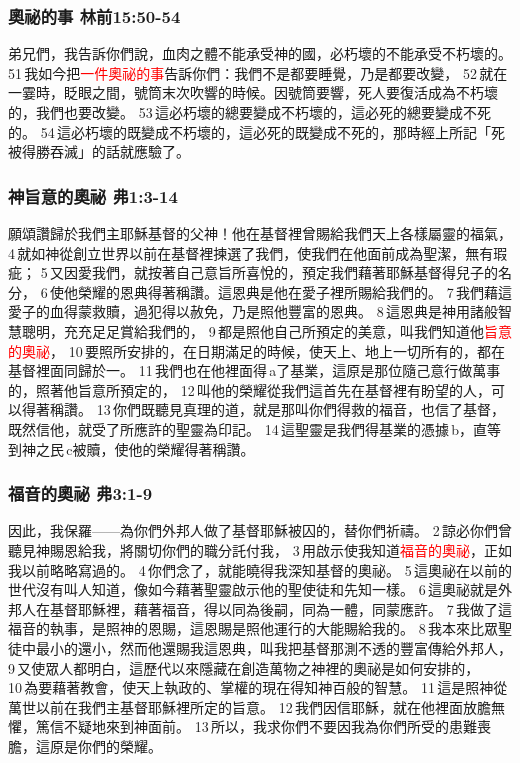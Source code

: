 \subsubsection{奧祕的事 林前15:50-54}
弟兄們，我告訴你們說，血肉之體不能承受神的國，必朽壞的不能承受不朽壞的。 51 我如今把\textcolor{red}{一件奧祕的事}告訴你們：我們不是都要睡覺，乃是都要改變， 52 就在一霎時，眨眼之間，號筒末次吹響的時候。因號筒要響，死人要復活成為不朽壞的，我們也要改變。 53 這必朽壞的總要變成不朽壞的，這必死的總要變成不死的。 54 這必朽壞的既變成不朽壞的，這必死的既變成不死的，那時經上所記「死被得勝吞滅」的話就應驗了。


\subsubsection{神旨意的奧祕 弗1:3-14}
願頌讚歸於我們主耶穌基督的父神！他在基督裡曾賜給我們天上各樣屬靈的福氣， 4 就如神從創立世界以前在基督裡揀選了我們，使我們在他面前成為聖潔，無有瑕疵； 5 又因愛我們，就按著自己意旨所喜悅的，預定我們藉著耶穌基督得兒子的名分， 6 使他榮耀的恩典得著稱讚。這恩典是他在愛子裡所賜給我們的。 7 我們藉這愛子的血得蒙救贖，過犯得以赦免，乃是照他豐富的恩典。 8 這恩典是神用諸般智慧聰明，充充足足賞給我們的， 9 都是照他自己所預定的美意，叫我們知道他\textcolor{red}{旨意的奧祕}， 10 要照所安排的，在日期滿足的時候，使天上、地上一切所有的，都在基督裡面同歸於一。 11 我們也在他裡面得 a了基業，這原是那位隨己意行做萬事的，照著他旨意所預定的， 12 叫他的榮耀從我們這首先在基督裡有盼望的人，可以得著稱讚。 13 你們既聽見真理的道，就是那叫你們得救的福音，也信了基督，既然信他，就受了所應許的聖靈為印記。 14 這聖靈是我們得基業的憑據 b，直等到神之民 c被贖，使他的榮耀得著稱讚。


\subsubsection{福音的奧祕 弗3:1-9}
因此，我保羅——為你們外邦人做了基督耶穌被囚的，替你們祈禱。 2 諒必你們曾聽見神賜恩給我，將關切你們的職分託付我， 3 用啟示使我知道\textcolor{red}{福音的奧祕}，正如我以前略略寫過的。 4 你們念了，就能曉得我深知基督的奧祕。 5 這奧祕在以前的世代沒有叫人知道，像如今藉著聖靈啟示他的聖使徒和先知一樣。 6 這奧祕就是外邦人在基督耶穌裡，藉著福音，得以同為後嗣，同為一體，同蒙應許。 7 我做了這福音的執事，是照神的恩賜，這恩賜是照他運行的大能賜給我的。 8 我本來比眾聖徒中最小的還小，然而他還賜我這恩典，叫我把基督那測不透的豐富傳給外邦人， 9 又使眾人都明白，這歷代以來隱藏在創造萬物之神裡的奧祕是如何安排的， 10 為要藉著教會，使天上執政的、掌權的現在得知神百般的智慧。 11 這是照神從萬世以前在我們主基督耶穌裡所定的旨意。 12 我們因信耶穌，就在他裡面放膽無懼，篤信不疑地來到神面前。 13 所以，我求你們不要因我為你們所受的患難喪膽，這原是你們的榮耀。


